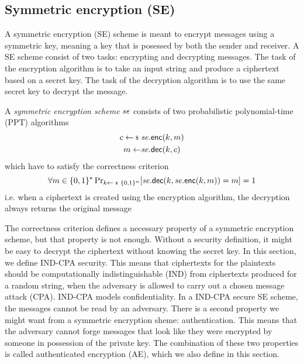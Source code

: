 \newpage
\subsection{Symmetric encryption (SE)}\label{ssec:enc-definition}
A symmetric encryption (SE) scheme is meant to encrypt messages using a symmetric key, meaning a key that is posessed by both the sender and receiver. A SE scheme consist of two tasks: encrypting and decrypting messages. The task of the encryption algorithm is to take an input string and produce a ciphertext based on a secret key. The task of the decryption algorithm is to use the same secret key to decrypt the message.

\begin{syntax}
  A \emph{symmetric encryption scheme} $\mathit{{se}}$ consists of two probabilistic polynomial-time (PPT) algorithms
  \begin{align*}
	c \sample&\se.\enc(k,m) \\
	m\gets&\se.\dec(k,c)
  \end{align*}
  which have to satisfy the correctness criterion
  \[\forall m\in\bin^* \probsub{k\sample\bin^n}{\se.\dec(k,\se.\enc(k,m))=m}=1\]
  i.e. when a ciphertext is created using the encryption algorithm, the decryption always returns the original message
\end{syntax}

\begin{remark}
	The correctness criterion defines a necessary property of a symmetric encryption scheme, but that property is not enough. Without a security definition, it might be easy to decrypt the ciphertext without knowing the secret key. In this section, we define IND-CPA security. This means that ciphertexts for the plaintexts should be computationally indistinguishable (IND) from ciphertexts produced for a random string, when the adversary is allowed to carry out a chosen message attack (CPA). IND-CPA models confidentiality. In a IND-CPA secure SE scheme, the messages cannot be read by an adversary. There is a second property we might want from a symmetric encryption sheme: authentication. This means that the adversary cannot forge messages that look like they were encrypted by someone in possession of the private key. The combination of these two properties is called authenticated encryption (AE), which we also define in this section.
\end{remark}

